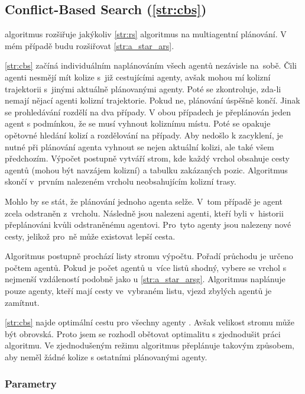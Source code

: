 \subsection{Conflict-Based Search (\ref{str:cbs})}\label{subsec:conflict_based_search}


 algoritmus \citep*{Sharon} rozšiřuje jakýkoliv \ref{str:rs} algoritmus
na multiagentní plánování.
V mém případě budu rozšiřovat \ref{str:a_star_ars}.

\ref{str:cbs} začíná individuálním naplánováním všech agentů nezávisle na~sobě.
Čili agenti nesmějí mít kolize s~již cestujícími agenty,
avšak mohou mí kolizní trajektorii s~jinými aktuálně plánovanými agenty.
Poté se zkontroluje, zda-li nemají nějací agenti kolizní trajektorie.
Pokud ne, plánování úspěšně končí.
Jinak se prohledávání rozdělí na dva případy.
V obou případech je přeplánován jeden agent s podmínkou, že se musí vyhnout koliznímu místu.
Poté se opakuje opětovné hledání kolizí a rozdělování na případy.
Aby nedošlo k zacyklení, je nutné při plánování agenta vyhnout se nejen aktuální kolizi, ale také všem předchozím.
Výpočet postupně vytváří strom,
kde každý vrchol obsahuje cesty agentů (mohou být navzájem kolizní) a tabulku zakázaných pozic.
Algoritmus skončí v~prvním nalezeném vrcholu neobsahujícím kolizní trasy.

Mohlo by se stát, že plánování jednoho agenta selže.
V~tom případě je agent zcela odstraněn z~vrcholu.
Následně jsou nalezeni agenti, kteří byli v~historii přeplánováni kvůli odstraněnému agentovi.
Pro~tyto agenty jsou nalezeny nové cesty, jelikož pro~ně může existovat lepší cesta.

Algoritmus postupně prochází listy stromu výpočtu.
Pořadí průchodu je určeno počtem agentů.
Pokud je počet agentů u~více listů shodný, vybere se vrchol s nejmenší vzdáleností podobně jako u \ref{str:a_star_arsg}.
Algoritmus naplánuje pouze agenty, kteří mají cesty ve~vybraném listu, vjezd zbylých agentů je zamítnut.

\ref{str:cbs} najde optimální cestu pro všechny agenty \citep{Sharon}.
Avšak velikost stromu může být obrovská.
Proto jsem se rozhodl obětovat optimalitu s zjednodušit práci algoritmu.
Ve zjednodušeným režimu algoritmus přeplánuje takovým způsobem, aby neměl žádné kolize s ostatními plánovanými agenty.

\subsubsection{Parametry}\label{subsubsec:cbs_parametry}

